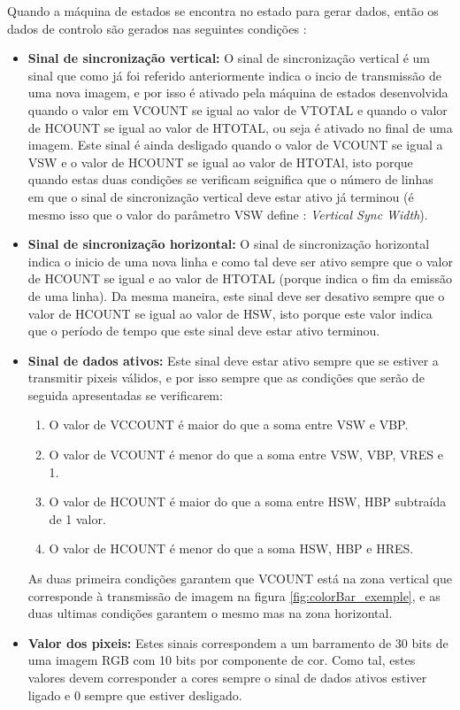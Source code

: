Quando a máquina de estados se encontra no estado para gerar dados, então os dados de controlo são gerados nas seguintes condições :
\begin{itemize}
	\item \textbf{Sinal de sincronização vertical:} O sinal de sincronização vertical é um sinal que como já foi referido anteriormente indica o incio de transmissão de uma nova imagem, e por isso é ativado pela máquina de estados desenvolvida quando o valor em VCOUNT se igual ao valor de VTOTAL e quando o valor de HCOUNT se igual ao valor de HTOTAL, ou seja é ativado no final de uma imagem. Este sinal é ainda desligado quando o valor de VCOUNT se igual a VSW e o valor de HCOUNT se igual ao valor de HTOTAl, isto porque quando estas duas condições se verificam seignifica que o número de linhas em que o sinal de sincronização vertical deve estar ativo já terminou (é mesmo isso que o valor do parâmetro VSW define : \textit{Vertical Sync Width}).
	
	\item \textbf{Sinal de sincronização horizontal:} O sinal de sincronização horizontal indica o inicio de uma nova linha e como tal deve ser ativo sempre que o valor de HCOUNT se igual e ao valor de HTOTAL (porque indica o fim da emissão de uma linha). Da mesma maneira, este sinal deve ser desativo sempre que o valor de HCOUNT se igual ao valor de HSW, isto porque este valor indica que o período de tempo que este sinal deve estar ativo terminou.
	
	\item \textbf{Sinal de dados ativos:} Este sinal deve estar ativo sempre que se estiver a transmitir pixeis válidos, e por isso sempre que as condições que serão de seguida apresentadas se verificarem:
	\begin{enumerate}
		\item O valor de VCCOUNT é maior do que a soma entre VSW e VBP.
		\item O valor de VCOUNT é menor do que a soma entre VSW, VBP, VRES e 1.
		\item O valor de HCOUNT é maior do que a soma entre HSW, HBP subtraída de 1 valor.
		\item O valor de HCOUNT é menor do que a soma HSW, HBP e HRES.
	\end{enumerate}
	As duas primeira condições garantem que VCOUNT está na zona vertical que corresponde à transmissão de imagem na figura \ref{fig:colorBar_exemple}, e as duas ultimas condições garantem o mesmo mas na zona horizontal.
	\item \textbf{Valor dos pixeis:} Estes sinais correspondem a um barramento de 30 bits de uma imagem RGB com 10 bits por componente de cor. Como tal, estes valores devem corresponder a cores sempre o sinal de dados ativos estiver ligado e 0 sempre que estiver desligado. 
\end{itemize}

